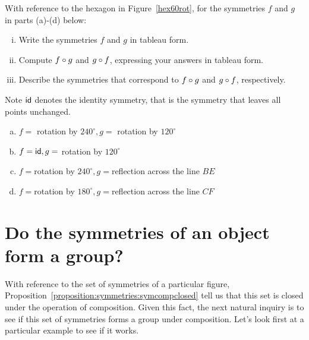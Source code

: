 \begin{exercise}{16}
With reference to the hexagon in Figure~\ref{hex60rot}, for the symmetries $f$ and $g$ in parts (a)-(d) below:
\begin{enumerate}[(i)]
\item
Write the symmetries $f$ and $g$ in tableau form.
\item
Compute $f \circ g$ and $g \circ f$, expressing your answers in tableau form.
\item 
Describe the symmetries that correspond to $f \circ g$ and $g \circ f$, respectively.
\end{enumerate}
\medskip

\noindent
Note ${\sf{i}d}$ denotes the identity symmetry, that is the symmetry that leaves all points unchanged.
\medskip

\begin{enumerate}[(a)]
\item
$f=$ rotation by $240^\circ, g=$ rotation by $120^\circ$
\item
$f={\sf{i}d}, g=$ rotation by $120^\circ$
\item
$f=$rotation by $ 240^\circ, g=$reflection across the line $BE$
\item 
$f=$rotation by $ 180^\circ, g=$reflection across the line $CF$
\end{enumerate}
\end{exercise}

\section{Do the symmetries of an object form a group?\quad
{}}\label{SymmetryGroup}

With reference to the set of symmetries of a particular figure,  Proposition~\ref{proposition:symmetries:symcompclosed} tell us that this set is closed under the operation of composition. Given this fact, the next natural inquiry is to see if this set of symmetries forms a group under composition.  Let's look first at a particular example to see if it works.

